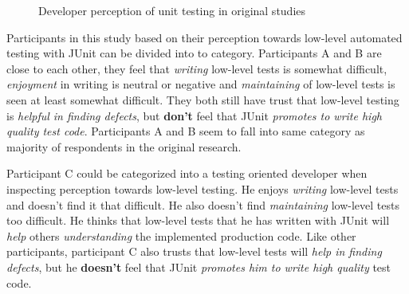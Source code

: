     \begin{figure}[ht]%
        \centering
        \qquad
        \caption{Developer perception of unit testing in original studies}%
        \label{fig:org-perception-two}%
    \end{figure}

Participants in this study based on their perception towards low-level automated testing with JUnit can be divided into
to category. Participants A and B are close to each other, they feel that
\textit{writing} low-level tests is somewhat difficult, \textit{enjoyment} in writing is neutral or negative and \textit{maintaining}
of low-level tests is seen at least somewhat difficult. They both still have trust that low-level testing is \textit{helpful in
finding defects}, but \textbf{don't} feel that JUnit \textit{promotes to write high quality test code}. Participants
A and B seem to fall into same category as majority of respondents in the original research.

Participant C could be categorized into a testing oriented developer when inspecting perception towards
low-level testing. He enjoys \textit{writing} low-level tests and doesn't find it that difficult. He also doesn't find
\textit{maintaining} low-level tests too difficult. He thinks that low-level tests that he has written with JUnit will \textit{help} others \textit{understanding}
the implemented production code. Like other participants, participant C also trusts that low-level
tests will \textit{help in finding defects}, but he \textbf{doesn't} feel that JUnit \textit{promotes him to write high quality} test code.

